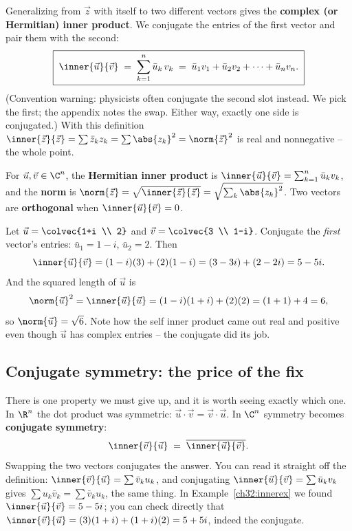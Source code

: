 Generalizing from $\vec z$ with itself to two different vectors gives the
\textbf{complex (or Hermitian) inner product}. We conjugate the entries of the
first vector and pair them with the second:
\[
  \boxed{\;\inner{\vec u}{\vec v} \;=\; \sum_{k=1}^n \bar u_k\, v_k
  \;=\; \bar u_1 v_1 + \bar u_2 v_2 + \cdots + \bar u_n v_n. \;}
\]
(Convention warning: physicists often conjugate the second slot instead. We pick
the first; the appendix notes the swap. Either way, exactly one side is
conjugated.) With this definition $\inner{\vec z}{\vec z} = \sum\bar z_kz_k =
\sum\abs{z_k}^2 = \norm{\vec z}^2$ is real and nonnegative -- the whole point.

\begin{definition}\label{ch32:inner}
For $\vec u,\vec v\in\C^n$, the \textbf{Hermitian inner product} is
$\inner{\vec u}{\vec v} = \sum_{k=1}^n \bar u_k v_k$, and the \textbf{norm} is
$\norm{\vec z} = \sqrt{\inner{\vec z}{\vec z}} = \sqrt{\sum_k\abs{z_k}^2}$.
Two vectors are \textbf{orthogonal} when $\inner{\vec u}{\vec v}=0$.
\end{definition}

\begin{example}\label{ch32:innerex}
Let $\vec u = \colvec{1+i \\ 2}$ and $\vec v = \colvec{3 \\ 1-i}$. Conjugate the
\emph{first} vector's entries: $\bar u_1 = 1-i$, $\bar u_2 = 2$. Then
\[
  \inner{\vec u}{\vec v} = (1-i)(3) + (2)(1-i) = (3-3i) + (2-2i) = 5 - 5i.
\]
And the squared length of $\vec u$ is
\[
  \norm{\vec u}^2 = \inner{\vec u}{\vec u}
  = (1-i)(1+i) + (2)(2) = (1+1) + 4 = 6,
\]
so $\norm{\vec u} = \sqrt 6$. Note how the self inner product came out real and
positive even though $\vec u$ has complex entries -- the conjugate did its job.
\end{example}

\subsection{Conjugate symmetry: the price of the fix}

There is one property we must give up, and it is worth seeing exactly which one.
In $\R^n$ the dot product was symmetric: $\vec u\cdot\vec v = \vec v\cdot\vec u$.
In $\C^n$ symmetry becomes \textbf{conjugate symmetry}:
\[
  \inner{\vec v}{\vec u} \;=\; \overline{\inner{\vec u}{\vec v}}.
\]
Swapping the two vectors conjugates the answer. You can read it straight off the
definition: $\inner{\vec v}{\vec u} = \sum\bar v_k u_k$, and conjugating
$\inner{\vec u}{\vec v}=\sum\bar u_kv_k$ gives $\sum u_k\bar v_k =
\sum\bar v_k u_k$, the same thing. In Example~\ref{ch32:innerex} we found
$\inner{\vec u}{\vec v} = 5-5i$; you can check directly that
$\inner{\vec v}{\vec u} = (3)(1+i)+(1+i)(2) = 5+5i$, indeed the conjugate.


